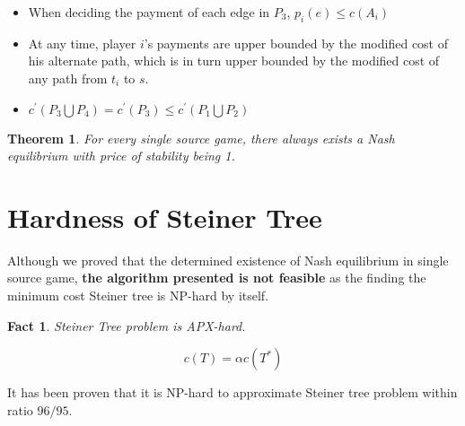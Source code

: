 \documentclass[11pt,psfig,times]{article}
\newtheorem{theorem}{Theorem}[section]
\newtheorem{fact}{Fact}
\begin{document}
	
		\begin{itemize}
			\item When deciding the payment of each edge in $P_3$, $p_i(e) \leq c(A_i)$
			\item At any time, player $i$'s payments are upper bounded by the modified cost of his alternate path, which is in turn upper bounded by the modified cost of any path from $t_i$ to $s$. 
			\item $ c^{'}(P_3\bigcup P_4) = c^{'}(P_3) \leq c^{'}(P_1\bigcup P_2)$
		\end{itemize}
	
	
		\begin{theorem}
			For every single source game, there always exists a Nash equilibrium with price of stability being 1.
		\end{theorem}
	
	
	\section{Hardness of Steiner Tree}
	Although we proved that the determined existence of Nash equilibrium in single source game, \textbf{the algorithm presented is not feasible} as the finding the minimum cost Steiner tree is NP-hard by itself. 
		
		\begin{fact}
			Steiner Tree problem is APX-hard.
		\end{fact}
	
		\begin{equation*}
			c(T) = \alpha c(T^*)
		\end{equation*}
	
		It has been proven that it is NP-hard to approximate Steiner tree problem within ratio \(96/95\). \\
		
\end{document}
